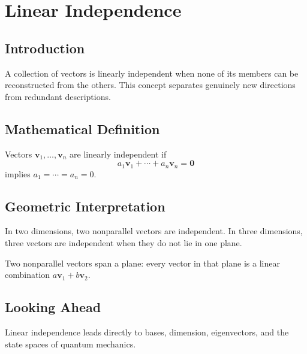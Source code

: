 \section{Linear Independence}
\label{sec:linear-independence}
\subsection{Introduction}
A collection of vectors is linearly independent when none of its members can be reconstructed from the others. This concept separates genuinely new directions from redundant descriptions.
\subsection{Mathematical Definition}
Vectors $\mathbf v_1,\ldots,\mathbf v_n$ are linearly independent if
\[
a_1\mathbf v_1+\cdots+a_n\mathbf v_n=\mathbf 0
\]
implies $a_1=\cdots=a_n=0$.
\subsection{Geometric Interpretation}
In two dimensions, two nonparallel vectors are independent. In three dimensions, three vectors are independent when they do not lie in one plane.
\begin{bookfigure}{Two nonparallel vectors span a plane: every vector in that plane is a linear combination $a\mathbf v_1+b\mathbf v_2$.}

\label{fig:span-plane}
\end{bookfigure}

\subsection{Looking Ahead}
Linear independence leads directly to bases, dimension, eigenvectors, and the state spaces of quantum mechanics.
